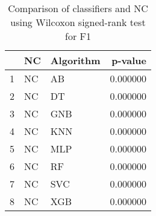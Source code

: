 \begin{table}
\footnotesize
\caption{Comparison of classifiers and NC using Wilcoxon signed-rank test for F1}
\label{tab:NC wilcoxon F1 comparison}
\begin{tabular}{lllr}
\hline
 & NC & Algorithm & p-value \\
\hline
1 & NC & AB & 0.000000 \\
2 & NC & DT & 0.000000 \\
3 & NC & GNB & 0.000000 \\
4 & NC & KNN & 0.000000 \\
5 & NC & MLP & 0.000000 \\
6 & NC & RF & 0.000000 \\
7 & NC & SVC & 0.000000 \\
8 & NC & XGB & 0.000000 \\
\hline
\end{tabular}
\end{table}
